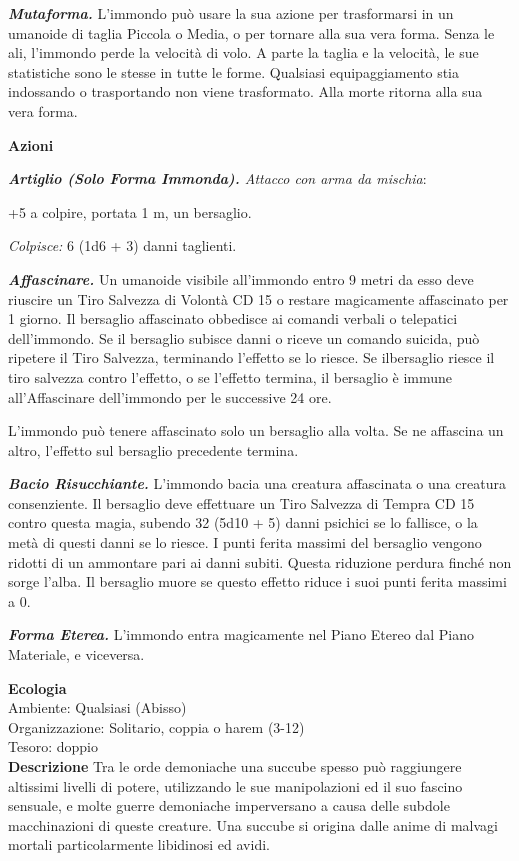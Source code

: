 \begin{multicols}{2}
\emph{\textbf{Mutaforma.}} L'immondo può usare la sua azione per trasformarsi in un umanoide di taglia Piccola o Media, o per tornare alla sua vera forma. Senza le ali, l'immondo perde la velocità di volo. A parte la taglia e la velocità, le sue statistiche sono le stesse in tutte le forme. Qualsiasi equipaggiamento stia indossando o trasportando non viene trasformato. Alla morte ritorna alla sua vera forma.

\textbf{Azioni}

\emph{\textbf{Artiglio (Solo Forma Immonda).} Attacco con arma da
	mischia}:

+5 a colpire, portata 1 m, un bersaglio.

\emph{Colpisce:} 6 (1d6 + 3) danni taglienti.

\emph{\textbf{Affascinare.}} Un umanoide visibile all'immondo entro 9 metri da esso deve riuscire un Tiro Salvezza di Volontà CD 15 o restare magicamente affascinato per 1 giorno. Il bersaglio affascinato obbedisce ai comandi verbali o telepatici dell'immondo. Se il bersaglio subisce danni o riceve un comando suicida, può ripetere il Tiro Salvezza, terminando l'effetto se lo riesce. Se ilbersaglio riesce il tiro  salvezza contro l'effetto, o se l'effetto termina, il bersaglio è immune all'Affascinare dell'immondo per le successive 24 ore.

L'immondo può tenere affascinato solo un bersaglio alla volta. Se ne affascina un altro, l'effetto sul bersaglio precedente termina.

\emph{\textbf{Bacio Risucchiante.}} L'immondo bacia una creatura affascinata o una creatura consenziente. Il bersaglio deve effettuare un Tiro Salvezza di Tempra CD 15 contro questa magia, subendo 32 (5d10 + 5) danni psichici se lo fallisce, o la metà di questi danni se lo riesce. I punti ferita massimi del bersaglio vengono ridotti di un ammontare pari ai danni subiti. Questa riduzione perdura finché non sorge l'alba. Il bersaglio muore se questo effetto riduce i suoi punti ferita massimi a 0.

\emph{\textbf{Forma Eterea.}} L'immondo entra magicamente nel Piano Etereo dal Piano Materiale, e viceversa.

\textbf{Ecologia}\\
Ambiente: Qualsiasi (Abisso)\\
Organizzazione: Solitario, coppia o harem (3-12)\\
Tesoro: doppio\\
\textbf{Descrizione}
Tra le orde demoniache una succube spesso può raggiungere altissimi livelli di potere, utilizzando le sue manipolazioni ed il suo fascino sensuale, e molte guerre demoniache imperversano a causa delle subdole macchinazioni di queste creature. Una succube si origina dalle anime di malvagi mortali particolarmente libidinosi ed avidi.\\



\end{multicols}
